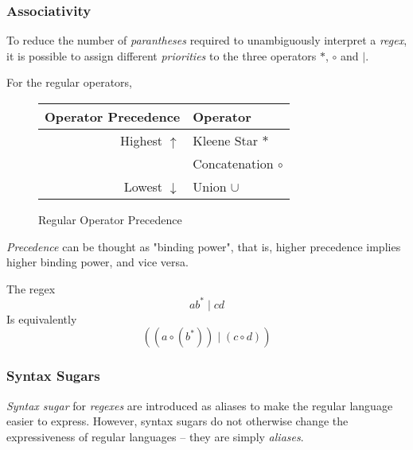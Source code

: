 \subsubsection{Associativity}

To reduce the number of \textit{parantheses} required to unambiguously interpret a \textit{regex}, it is possible to assign different \textit{priorities} to the three operators $\ast$, $\circ$ and $\mid$.

\begin{definition}
    For the regular operators,
    \begin{figure}[H]
        \centering
        \begin{tabular}{@{} r | l @{}}
            \toprule
            Operator Precedence & Operator              \\
            \midrule
            Highest $\uparrow$  & Kleene Star $\ast$    \\
            \phantom{}          & Concatenation $\circ$ \\
            Lowest $\downarrow$ & Union $\cup$          \\
            \bottomrule
        \end{tabular}
        \caption{Regular Operator Precedence}
        \label{tab:regex-operator-precedence}
    \end{figure}
\end{definition}

\begin{remark}
    \textit{Precedence} can be thought as "binding power", that is, higher precedence implies higher binding power, and vice versa.
\end{remark}

\begin{example}
    The regex 
    \begin{equation*}
        ab^\ast \mid cd
    \end{equation*}
    Is equivalently
    \begin{equation*}
        ((a \circ (b^\ast)) \mid (c \circ d))
    \end{equation*}
\end{example}
\subsubsection{Syntax Sugars}

\begin{definition}
    \textit{Syntax sugar} for \textit{regexes} are introduced as aliases to make the regular language easier to express. However, syntax sugars do not otherwise change the expressiveness of regular languages -- they are simply \textit{aliases}.
\end{definition}

